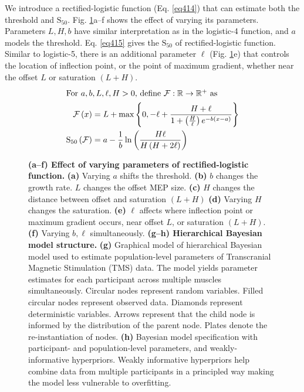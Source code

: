 \documentclass[pdflatex,sn-mathphys-ay]{sn-jnl}%
\numberwithin{equation}{subsection}
\theoremstyle{thmstyleone}%
\theoremstyle{thmstyletwo}%
\theoremstyle{thmstylethree}%
\begin{document}
We introduce a rectified-logistic function (Eq. \ref{eq414}) that can estimate both the threshold and $\text{S}_{50}$. Fig. \ref{fig-default}a--f shows the effect of varying its parameters. Parameters $L, H, b$ have similar interpretation as in the logistic-4 function, and $a$ models the threshold. Eq. \ref{eq415} gives the $\text{S}_{50}$ of rectified-logistic function. Similar to logistic-5, there is an additional parameter $\ell$ (Fig. \ref{fig-default}e) that controls the location of inflection point, or the point of maximum gradient, whether near the offset $L$ or saturation $\left(L + H\right)$.
\begin{align}
    \intertext{For $a, b, L, \ell, H > 0$, define $\mathcal{F}: \mathbb{R} \to \mathbb{R}^{+}$ as}
    \mathcal{F}\left(x\right) &= L + \max\left\{0, -\ell + \frac{H + \ell}{1 + \left(\frac{H}{\ell}\right)e^{-b\left(x-a\right)}} \right\} \label{eq414}\\
    {\text{S}_{50}}\left(\mathcal{F}\right)&= a - \frac1b\ln\left(\frac{H\ell}{H\left(H + 2\ell\right)}\right) \label{eq415}
\end{align}

\begin{figure}[h]
    \centering
    \caption{\textbf{(a--f) Effect of varying parameters of rectified-logistic function.} \textbf{(a)} Varying $a$ shifts the threshold. \textbf{(b)} $b$ changes the growth rate. $L$ changes the offset MEP size. \textbf{(c)} $H$ changes the distance between offset and saturation $\left(L + H\right)$ \textbf{(d)} Varying $H$ changes the saturation. \textbf{(e)} $\ell$ affects where inflection point or maximum gradient occurs, near offset $L$, or saturation $\left(L + H\right)$. \textbf{(f)} Varying $b, \ell$ simultaneously. \textbf{(g--h) Hierarchical Bayesian model structure.} \textbf{(g)} Graphical model of hierarchical Bayesian model used to estimate population-level parameters of Transcranial Magnetic Stimulation (TMS) data. The model yields parameter estimates for each participant across multiple muscles simultaneously. Circular nodes represent random variables. Filled circular nodes represent observed data. Diamonds represent deterministic variables. Arrows represent that the child node is informed by the distribution of the parent node. Plates denote the re-instantiation of nodes. \textbf{(h)} Bayesian model specification with participant- and population-level parameters, and weakly-informative hyperpriors. Weakly informative hyperpriors help combine data from multiple participants in a principled way making the model less vulnerable to overfitting.}\label{fig-default}
\end{figure}
\end{document}
